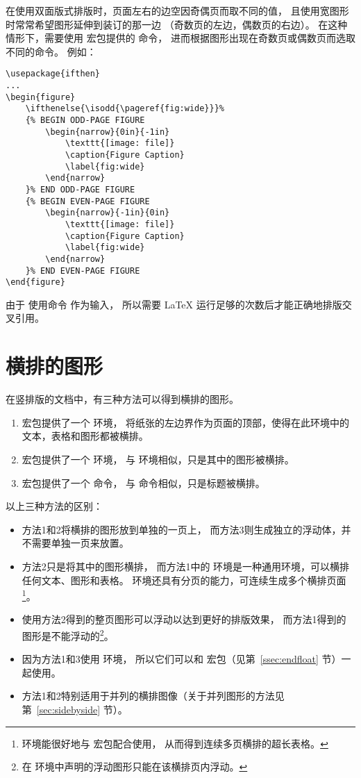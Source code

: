 在使用双面版式排版时，页面左右的边空因奇偶页而取不同的值，
且使用宽图形时常常希望图形延伸到装订的那一边
（奇数页的左边，偶数页的右边）。
在这种情形下，需要使用  宏包提供的  命令，
进而根据图形出现在奇数页或偶数页而选取不同的命令。
例如：
\begin{lstlisting}
\usepackage{ifthen}
...
\begin{figure}
	\ifthenelse{\isodd{\pageref{fig:wide}}}%
	{% BEGIN ODD-PAGE FIGURE
		\begin{narrow}{0in}{-1in}
			\texttt{[image: file]}
			\caption{Figure Caption}
			\label{fig:wide}
		\end{narrow}
	}% END ODD-PAGE FIGURE
	{% BEGIN EVEN-PAGE FIGURE
		\begin{narrow}{-1in}{0in}
			\texttt{[image: file]}
			\caption{Figure Caption}
			\label{fig:wide}
		\end{narrow}
	}% END EVEN-PAGE FIGURE
\end{figure}
\end{lstlisting}
由于  使用命令  作为输入，
所以需要 \LaTeX{} 运行足够的次数后才能正确地排版交叉引用。


\section{横排的图形}\label{sec:lscapefig}

在竖排版的文档中，有三种方法可以得到横排的图形。
\begin{enumerate}
	\item {} 宏包提供了一个  环境，
	将纸张的左边界作为页面的顶部，使得在此环境中的文本，表格和图形都被横排。
	\item {} 宏包提供了一个  环境，
	与  环境相似，只是其中的图形被横排。
	\item {} 宏包提供了一个  命令，
	与  命令相似，只是标题被横排。
\end{enumerate}

以上三种方法的区别：
\begin{itemize}
	\item 方法1和2将横排的图形放到单独的一页上，
	而方法3则生成独立的浮动体，并不需要单独一页来放置。
	\item 方法2只是将其中的图形横排，
	而方法1中的  环境是一种通用环境，可以横排任何文本、图形和表格。
	 环境还具有分页的能力，可连续生成多个横排页面\footnote
		{ 环境能很好地与  宏包配合使用，
		从而得到连续多页横排的超长表格。}。
	\item 使用方法2得到的整页图形可以浮动以达到更好的排版效果，
	而方法1得到的图形是不能浮动的\footnote{
		在 环境中声明的浮动图形只能在该横排页内浮动。}。
	\item 因为方法1和3使用  环境，
	所以它们可以和  宏包（见第~\ref{ssec:endfloat} 节）一起使用。
	\item 方法1和2特别适用于并列的横排图像（关于并列图形的方法见第~\ref{sec:sidebyside} 节）。
\end{itemize}

